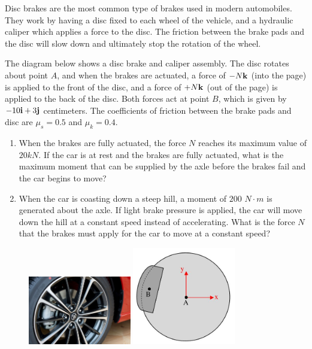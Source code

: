 
Disc brakes are the most common type of brakes used in modern automobiles. They work by having a disc fixed to each wheel of the vehicle, and a hydraulic caliper which applies a force to the disc. The friction between the brake pads and the disc will slow down and ultimately stop the rotation of the wheel. 

The diagram below shows a disc brake and caliper assembly. The disc rotates about point $A$, and when the brakes are actuated, a force of $-N {\bf k}$ (into the page) is applied to the front of the disc, and a force of $+N {\bf k}$ (out of the page) is applied to the back of the disc. Both forces act at point $B$, which is given by $-10 {\bf i} + 3 {\bf j}$ centimeters. The coefficients of friction between the brake pads and disc are $\mu_s = 0.5$ and $\mu_k= 0.4$.

\begin{enumerate}
  \item When the brakes are fully actuated, the force $N$ reaches its maximum value of $20kN$. If the car is at rest and the brakes are fully actuated, what is the maximum moment that can be supplied by the axle before the brakes fail and the car begins to move?
  \item When the car is coasting down a steep hill, a moment of $200$ $N\cdot m$ is generated about the axle. If light brake pressure is applied, the car will move down the hill at a constant speed instead of accelerating. What is the force $N$ that the brakes must apply for the car to move at a constant speed?
\end{enumerate}

\begin{figure}[ht!]
  \centering
  \includegraphics[width=0.4\textwidth,
	           height=0.1\textheight,
		   keepaspectratio]{figa.png}
  \includegraphics[width=0.4\textwidth,
	           height=0.1\textheight,
		   keepaspectratio]{figb.png}
\end{figure}

